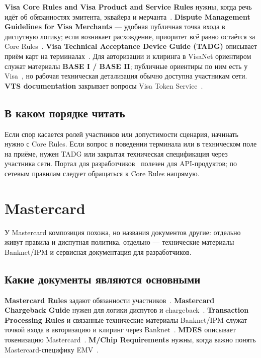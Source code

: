 \textbf{Visa Core Rules and Visa Product and Service Rules}
нужны, когда речь идёт об обязанностях эмитента, эквайера
и мерчанта~\cite{visa-core-rules}. \textbf{Dispute Management
Guidelines for Visa Merchants}
— удобная публичная точка входа в диспутную логику; если
возникает расхождение, приоритет всё равно остаётся за Core
Rules~\cite{visa-dispute-guidelines-merchants}.
\textbf{Visa Technical Acceptance Device Guide (TADG)}
описывает приём карт на терминалах~\cite{visa-tadg}. Для авторизации и клиринга
в VisaNet ориентиром служат материалы \textbf{BASE I / BASE II};
публичные ориентиры по ним есть у Visa~\cite{visa-visanet-booklet},
но рабочая техническая
детализация обычно доступна участникам сети.
\textbf{VTS documentation} закрывает вопросы Visa Token Service~\cite{visa-vts}.

\subsection*{В каком порядке читать}

Если спор касается ролей участников или допустимости сценария,
начинать нужно с Core Rules. Если вопрос в поведении терминала
или в техническом поле на приёме, нужен TADG или закрытая
техническая спецификация через участника сети. Портал
для разработчиков~\cite{visa-developer-portal} полезен
для API-продуктов; по сетевым правилам следует обращаться к Core Rules напрямую.

\section{Mastercard}
\label{sec:ps-mastercard}

У Mastercard композиция похожа, но названия документов
другие: отдельно живут правила и диспутная политика, отдельно —
технические материалы Banknet/IPM и сервисная документация
для разработчиков.

\subsection*{Какие документы являются основными}

\textbf{Mastercard Rules} задают обязанности участников~\cite{mc-rules}.
\textbf{Mastercard Chargeback Guide} нужен для логики диспутов
и chargeback~\cite{mc-chargeback-guide}. \textbf{Transaction Processing Rules}
и связанные технические материалы Banknet/IPM служат точкой
входа в авторизацию и клиринг через Banknet~\cite{mc-tpr,mc-switching-services}.
\textbf{MDES} описывает токенизацию Mastercard~\cite{mc-mdes-token-connect}.
\textbf{M/Chip Requirements} нужны, когда важно понять
Mastercard-специфику EMV~\cite{mc-mchip}.

